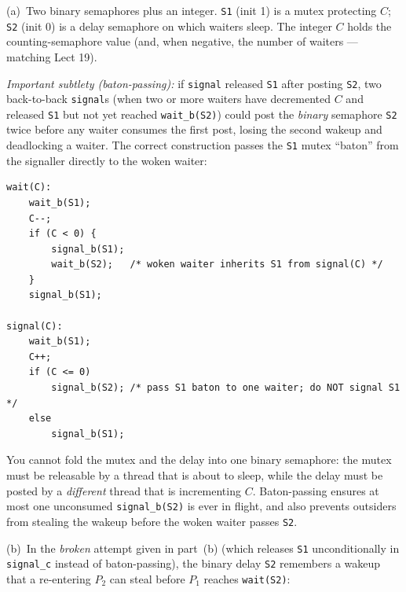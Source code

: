 \documentclass[11pt,a4paper]{article}
\newenvironment{Sol}{%
  \begin{tcolorbox}[sboxstyle, title={Solution}]%
}{%
  \end{tcolorbox}\vspace{0.35em}%
}
\begin{document}
\begin{Sol}
(a)~Two binary semaphores plus an integer. \texttt{S1} (init 1) is a mutex
protecting $C$; \texttt{S2} (init 0) is a delay semaphore on which waiters
sleep. The integer $C$ holds the counting-semaphore value (and, when
negative, the number of waiters --- matching Lect 19).

\emph{Important subtlety (baton-passing):} if \texttt{signal} released
\texttt{S1} after posting \texttt{S2}, two back-to-back \texttt{signal}s
(when two or more waiters have decremented $C$ and released \texttt{S1}
but not yet reached \texttt{wait\_b(S2)}) could post the \emph{binary}
semaphore \texttt{S2} twice before any waiter consumes the first post,
losing the second wakeup and deadlocking a waiter. The correct construction passes the \texttt{S1}
mutex ``baton'' from the signaller directly to the woken waiter:
\begin{lstlisting}[numbers=none]
wait(C):
    wait_b(S1);
    C--;
    if (C < 0) {
        signal_b(S1);
        wait_b(S2);   /* woken waiter inherits S1 from signal(C) */
    }
    signal_b(S1);

signal(C):
    wait_b(S1);
    C++;
    if (C <= 0)
        signal_b(S2); /* pass S1 baton to one waiter; do NOT signal S1 */
    else
        signal_b(S1);
\end{lstlisting}
You cannot fold the mutex and the delay into one binary semaphore: the
mutex must be releasable by a thread that is about to sleep, while the
delay must be posted by a \emph{different} thread that is incrementing $C$.
Baton-passing ensures at most one unconsumed \texttt{signal\_b(S2)} is ever
in flight, and also prevents outsiders from stealing the wakeup before the
woken waiter passes \texttt{S2}.

(b)~In the \emph{broken} attempt given in part~(b) (which releases
\texttt{S1} unconditionally in \texttt{signal\_c} instead of baton-passing),
the binary delay \texttt{S2} remembers a wakeup that a re-entering $P_2$ can
steal before $P_1$ reaches \texttt{wait(S2)}:


\end{Sol}
\end{document}
